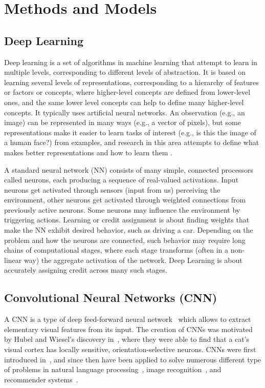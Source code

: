 \section{Methods and Models}

\subsection{Deep Learning}
Deep learning is a set of algorithms in machine learning that attempt to learn in multiple levels, corresponding to different levels of abstraction. It is based on learning several levels of representations, corresponding to a hierarchy of features or factors or concepts, where higher-level concepts are defined from lower-level ones, and the same lower level concepts can help to define many higher-level concepts. It typically uses artificial neural networks. An observation (e.g., an image) can be represented in many ways (e.g., a vector of pixels), but some representations make it easier to learn tasks of interest (e.g., is this the image of a human face?) from examples, and research in this area attempts to define what makes better representations and how to learn them \cite{DeepLearning}.

A standard neural network (NN) consists of many simple, connected processors called neurons, each producing a sequence of real-valued activations. Input neurons get activated through sensors (input from us) perceiving the environment, other neurons get activated through weighted connections from previously active neurons. Some neurons may influence the environment by triggering actions.\cite{NeuralNetwork} Learning or credit assignment is about finding weights that make the NN exhibit desired behavior, such as driving a car. Depending on the problem and how the neurons are connected, such behavior may require long chains of computational stages, where each stage transforms (often in a non-linear way) the aggregate activation of the network. Deep Learning is about accurately assigning credit across many such stages.

\subsection{Convolutional Neural Networks (CNN)}

A CNN is a type of deep feed-forward neural network~\cite{cnn-star-galaxy} which allows to extract elementary visual features from its input. The creation of CNNs was motivated by Hubel and Wiesel's discovery in~\cite{hubel-wiesel-receptive-fields}, where they were able to find that a cat's visual cortex has locally sensitive, orientation-selective neurons. CNNs were first introduced in~\cite{Lecun99objectrecognition}, and since then have been applied to solve numerous different type of problems in  natural language processing~\cite{Collobert:2008:UAN:1390156.1390177}, image recognition~\cite{cnn-star-galaxy}, and recommender systems~\cite{NIPS2013_5004}.

